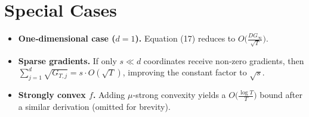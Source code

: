 \documentclass{article}
\begin{document}
\section*{Special Cases}
\begin{itemize}
\item \textbf{One‑dimensional case ($d=1$).} Equation (17) reduces to $O\bigl(\frac{DG_{\infty}}{\sqrt{T}}\bigr)$.
\item \textbf{Sparse gradients.} If only $s\ll d$ coordinates receive non‑zero gradients, then $\sum_{j=1}^{d}\sqrt{G_{T,j}}=s\cdot O(\sqrt{T})$, improving the constant factor to $\sqrt{s}$.
\item \textbf{Strongly convex $f$.} Adding $\mu$‑strong convexity yields a $O\bigl(\frac{\log T}{T}\bigr)$ bound after a similar derivation (omitted for brevity).
\end{itemize}
\end{document}
